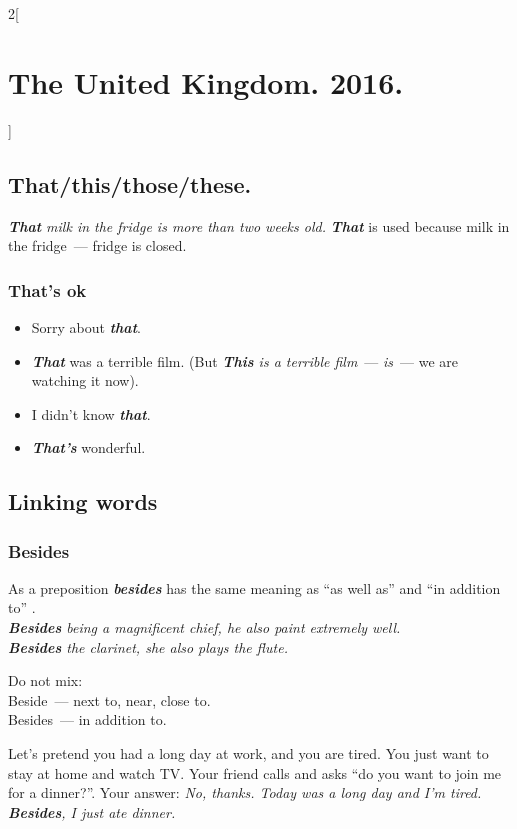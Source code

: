 \documentclass[10pt,a4paper]{article}
\newlength{\OriginalParIndent}
\newcommand\ex[1]{\textit{\textbf{{#1}}}}           %
\newenvironment{ItemizeWithOrigParIndent}
    {\begin{itemize}[leftmargin=\OriginalParIndent]}
    {\end{itemize}}
\begin{document}
\begin{multicols}{2}[\section{The United Kingdom. 2016.}]
\subsection{That/this/those/these.}
\textit{\ex{That} milk in the fridge is more than two weeks old.} \ex{That} is used because milk in
the fridge~--- fridge is closed.

\subsubsection{That's ok}
\begin{ItemizeWithOrigParIndent}
  \item Sorry about \ex{that}.
  \item \ex{That} was a terrible film. (But \textit{\ex{This} is a terrible film}~---
  \textit{is}~--- we are watching it now).
  \item I didn't know \ex{that}.
  \item \ex{That's} wonderful.
\end{ItemizeWithOrigParIndent}





\subsection{Linking words}
\subsubsection{Besides}
As a preposition \ex{besides} has the same meaning as ``as well as'' and ``in addition to'' .\\
\textit{\ex{Besides} being a magnificent chief, he also paint extremely well.}\\
\textit{\ex{Besides} the clarinet, she also plays the flute.}

Do not mix:\\
Beside~--- next to, near, close to.\\
Besides~--- in addition to.

Let's pretend you had a long day at work, and you are tired. You just want to stay at home and watch TV. Your friend calls and asks ``do you want to join me for a dinner?''.
Your answer: \textit{No, thanks. Today was a long day and I'm tired. \ex{Besides}, I just ate dinner.}






\end{multicols}
\end{document}
